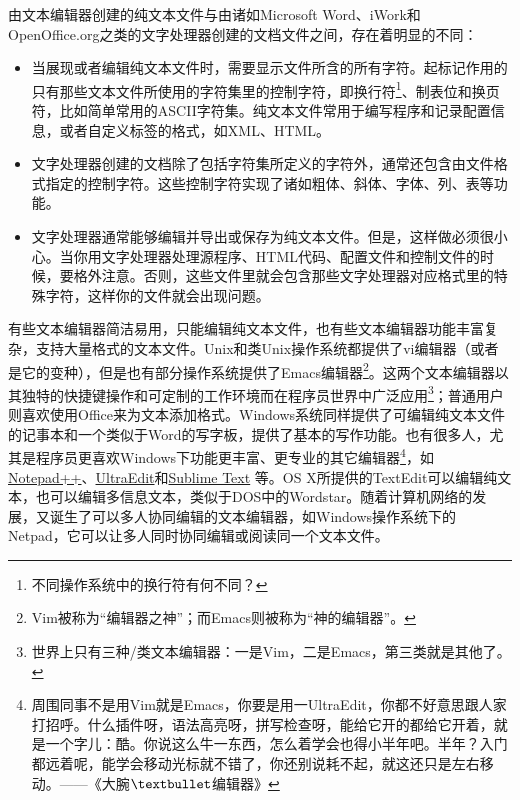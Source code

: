 \documentclass[11pt,a4paper,twoside]{book}
\begin{document}
由文本编辑器创建的纯文本文件与由诸如Microsoft Word、iWork和OpenOffice.org之类的文字处理器创建的文档文件之间，存在着明显的不同：
\begin{itemize}
  \item 当展现或者编辑纯文本文件时，需要显示文件所含的所有字符。起标记作用的只有那些文本文件所使用的字符集里的控制字符，即换行符\footnote{不同操作系统中的换行符有何不同？}、制表位和换页符，比如简单常用的ASCII字符集。纯文本文件常用于编写程序和记录配置信息，或者自定义标签的格式，如XML、HTML。
  \item 文字处理器创建的文档除了包括字符集所定义的字符外，通常还包含由文件格式指定的控制字符。这些控制字符实现了诸如粗体、斜体、字体、列、表等功能。
  \item 文字处理器通常能够编辑并导出或保存为纯文本文件。但是，这样做必须很小心。当你用文字处理器处理源程序、HTML代码、配置文件和控制文件的时候，要格外注意。否则，这些文件里就会包含那些文字处理器对应格式里的特殊字符，这样你的文件就会出现问题。
\end{itemize}

有些文本编辑器简洁易用，只能编辑纯文本文件，也有些文本编辑器功能丰富复杂，支持大量格式的文本文件。Unix和类Unix操作系统都提供了vi编辑器（或者是它的变种），但是也有部分操作系统提供了Emacs编辑器\footnote{Vim被称为“编辑器之神”；而Emacs则被称为“神的编辑器”。}。这两个文本编辑器以其独特的快捷键操作和可定制的工作环境而在程序员世界中广泛应用\footnote{世界上只有三种/类文本编辑器：一是Vim，二是Emacs，第三类就是其他了。}；普通用户则喜欢使用Office来为文本添加格式。Windows系统同样提供了可编辑纯文本文件的记事本和一个类似于Word的写字板，提供了基本的写作功能。也有很多人，尤其是程序员更喜欢Windows下功能更丰富、更专业的其它编辑器\footnote{周围同事不是用Vim就是Emacs，你要是用一UltraEdit，你都不好意思跟人家打招呼。什么插件呀，语法高亮呀，拼写检查呀，能给它开的都给它开着，就是一个字儿：酷。你说这么牛一东西，怎么着学会也得小半年吧。半年？入门都远着呢，能学会移动光标就不错了，你还别说耗不起，就这还只是左右移动。——《大腕$\textbullet$编辑器》}，如 \href{http://notepad-plus-plus.org/}{Notepad++}、\href{http://www.ultraedit.com/index.html}{UltraEdit}和\href{http://www.sublimetext.com/}{Sublime Text} 等。OS X所提供的TextEdit可以编辑纯文本，也可以编辑多信息文本，类似于DOS中的Wordstar。随着计算机网络的发展，又诞生了可以多人协同编辑的文本编辑器，如Windows操作系统下的Netpad，它可以让多人同时协同编辑或阅读同一个文本文件。
\end{document}
